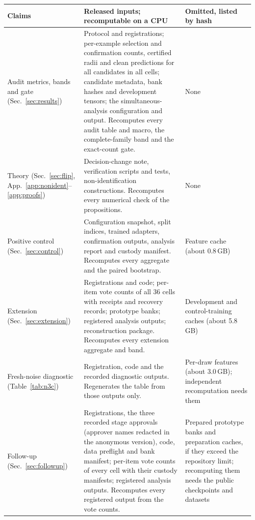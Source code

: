 \begin{center}
\footnotesize
\begin{tabular}{@{}p{}p{}p{}@{}}
\toprule
\raggedright Claims & \raggedright Released inputs; recomputable on a CPU & \raggedright Omitted, listed by hash\tabularnewline
\midrule
\raggedright Audit metrics, bands and gate (Sec.~\ref{sec:results}) & \raggedright Protocol and registrations; per-example selection and confirmation counts, certified radii and clean predictions for all \ExpCandidates{} candidates in all \ExpCells{} cells; candidate metadata, bank hashes and development tensors; the simultaneous-analysis configuration and output. Recomputes every audit table and macro, the complete-family band and the exact-count gate. & \raggedright None\tabularnewline
\addlinespace
\raggedright Theory (Sec.~\ref{sec:flip}, App.~\ref{app:nonident}--\ref{app:proofs}) & \raggedright Decision-change note, verification scripts and tests, non-identification constructions. Recomputes every numerical check of the propositions. & \raggedright None\tabularnewline
\addlinespace
\raggedright Positive control (Sec.~\ref{sec:control}) & \raggedright Configuration snapshot, split indices, trained adapters, confirmation outputs, analysis report and custody manifest. Recomputes every aggregate and the paired bootstrap. & \raggedright Feature cache (about 0.8\,GB)\tabularnewline
\addlinespace
\raggedright Extension (Sec.~\ref{sec:extension}) & \raggedright Registrations and code; per-item vote counts of all 36 cells with receipts and recovery records; prototype banks; registered analysis outputs; reconstruction package. Recomputes every extension aggregate and band. & \raggedright Development and control-training caches (about 5.8\,GB)\tabularnewline
\addlinespace
\raggedright Fresh-noise diagnostic (Table~\ref{tab:n3c}) & \raggedright Registration, code and the recorded diagnostic outputs. Regenerates the table from those outputs only. & \raggedright Per-draw features (about 3.0\,GB); independent recomputation needs them\tabularnewline
\addlinespace
\raggedright Follow-up (Sec.~\ref{sec:followup}) & \raggedright Registrations, the three recorded stage approvals (approver names redacted in the anonymous version), code, data preflight and bank manifest; per-item vote counts of every cell with their custody manifests; registered analysis outputs. Recomputes every registered output from the vote counts. & \raggedright Prepared prototype banks and preparation caches, if they exceed the repository limit; recomputing them needs the public checkpoints and datasets\tabularnewline
\bottomrule
\end{tabular}
\end{center}

